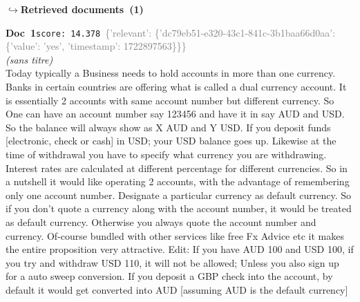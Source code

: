 \documentclass[a4paper,11pt]{article}
\begin{document}
\noindent\hfill{\footnotesize\textcolor{doccolor}{\textbf{$\hookrightarrow$\enspace Retrieved documents~(1)}}}
\begin{docenv}
{\footnotesize\textcolor{doccolor}{\textbf{Doc~1}}}\hfill{\tiny\texttt{score:~14.378}}\ {\tiny\textcolor{gray}{\{'relevant': \{'dc79eb51-e320-43c1-841c-3b1baa66d0aa': \{'value': 'yes', 'timestamp': 1722897563\}\}\}}}\\[3pt]
{\small\textit{(sans titre)}}\\[2pt]
\vspace{2pt}
{\footnotesize 
Today typically a Business needs to hold accounts in more than one currency. Banks in certain countries are offering what is called a dual currency account. It is essentially 2 accounts with same account number but different currency. So One can have an account number say 123456 and have it in say AUD and USD. So the balance will always show as X AUD and Y USD. If you deposit funds [electronic, check or cash] in USD; your USD balance goes up. Likewise at the time of withdrawal you have to specify what currency you are withdrawing. Interest rates are calculated at different percentage for different currencies.  So in a nutshell it would like operating 2 accounts, with the advantage of remembering only one account number. Designate a particular currency as default currency. So if you don't quote a currency along with the account number, it would be treated as default currency. Otherwise you always quote the account number and currency. Of-course bundled with other services like free Fx Advice etc it makes the entire proposition very attractive. Edit: If you have AUD 100 and USD 100, if you try and withdraw USD 110, it will not be allowed; Unless you also sign up for a auto sweep conversion.  If you deposit a GBP check into the account, by default it would get converted into AUD [assuming AUD is the default currency]}
\end{docenv}
\end{document}

